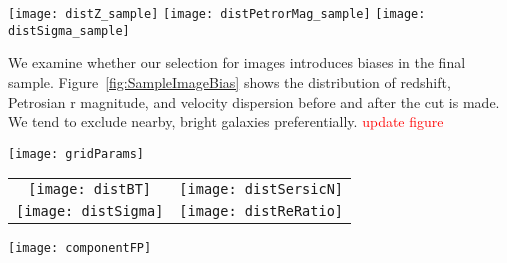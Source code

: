 \documentclass[iop]{emulateapj}
\newcommand{\Sersic}{S\'ersic}
\newcommand\todo[1]{\textcolor{red}{#1}}
\begin{document}
\begin{figure*}[]
    \begin{center}
        \texttt{[image: distZ\_sample]}
        \texttt{[image: distPetrorMag\_sample]}
        \texttt{[image: distSigma\_sample]}
    \end{center}
    \caption{Distribution of redshift, Petrosian r magnitude, and velocity
        dispersion before and after excluding bad images.
        Bottom panels show the fraction of excluded galaxies in each bin.}
    \label{fig:SampleImageBias}
\end{figure*}

We examine whether our selection for images introduces biases
in the final sample.
Figure~\ref{fig:SampleImageBias} shows the distribution of redshift, Petrosian
r magnitude, and velocity dispersion before and after the cut is made.
We tend to exclude nearby, bright galaxies preferentially.
\todo{update figure}



\begin{figure*}[]
    \begin{center}
        \texttt{[image: gridParams]}
    \end{center}
    \caption{Correlation between key parameters of deVExp model. Red points
        highlight double component galaxies.}
    \label{fig:CornerPlot}
\end{figure*}

\begin{figure*}[]
    \begin{tabular}{cc}
        \texttt{[image: distBT]} &
        \texttt{[image: distSersicN]}\\
        \texttt{[image: distSigma]} &
        \texttt{[image: distReRatio]}
    \end{tabular}
    \caption{Distribution of $B/T$, \Sersic index, $\sigma$ and
        $R_{e,1}/R_{e,4}$ for single and double component galaxies.}
    \label{fig:DoubleCompParams}
\end{figure*}

\begin{figure*}[]
    \begin{center}
        \texttt{[image: componentFP]}
    \end{center}
    \caption{The Fundamental Plane relation for deV (red) and Exp (blue)
        component of deVExp model. The two figures are identical except
        highlighted component. Larger symbols are for double component
        galaxies.}
    \label{fig:ComponentFP}
\end{figure*}
\end{document}
